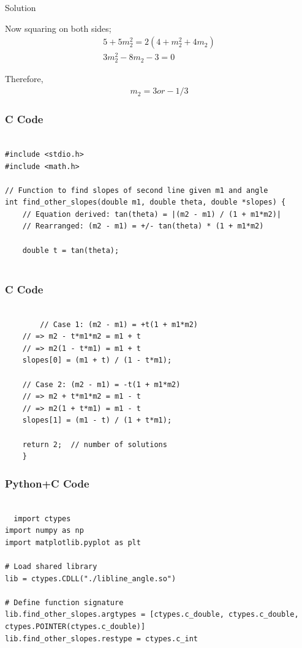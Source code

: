 \documentclass{beamer}
\begin{document}
\begin{frame}{Solution}

Now squaring on both sides;
\begin{align}
    5+5m_2^2=2(4+m_2^2+4m_2)\\
    3m_2^2-8m_2-3=0
\end{align}

Therefore,
\begin{align}
    m_2=3or-1/3
\end{align}    
\end{frame}


\begin{frame}[fragile]
    \frametitle{C Code}

    \begin{lstlisting}

#include <stdio.h>
#include <math.h>

// Function to find slopes of second line given m1 and angle
int find_other_slopes(double m1, double theta, double *slopes) {
    // Equation derived: tan(theta) = |(m2 - m1) / (1 + m1*m2)|
    // Rearranged: (m2 - m1) = +/- tan(theta) * (1 + m1*m2)

    double t = tan(theta);
    

    \end{lstlisting}
\end{frame}

\begin{frame}[fragile]
    \frametitle{C Code}
    \begin{lstlisting}
    
        // Case 1: (m2 - m1) = +t(1 + m1*m2)
    // => m2 - t*m1*m2 = m1 + t
    // => m2(1 - t*m1) = m1 + t
    slopes[0] = (m1 + t) / (1 - t*m1);

    // Case 2: (m2 - m1) = -t(1 + m1*m2)
    // => m2 + t*m1*m2 = m1 - t
    // => m2(1 + t*m1) = m1 - t
    slopes[1] = (m1 - t) / (1 + t*m1);

    return 2;  // number of solutions
    }

    \end{lstlisting}
\end{frame}

\begin{frame}[fragile]
    \frametitle{Python+C Code}
    \begin{lstlisting}
    
  import ctypes
import numpy as np
import matplotlib.pyplot as plt

# Load shared library
lib = ctypes.CDLL("./libline_angle.so")

# Define function signature
lib.find_other_slopes.argtypes = [ctypes.c_double, ctypes.c_double, ctypes.POINTER(ctypes.c_double)]
lib.find_other_slopes.restype = ctypes.c_int





    \end{lstlisting}
\end{frame}
\end{document}
